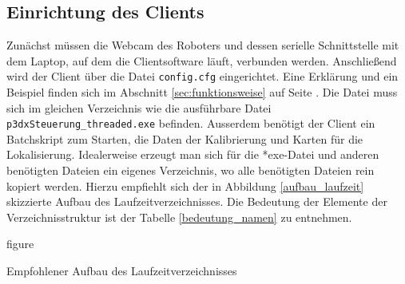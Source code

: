 
\subsection{Einrichtung des Clients}%
\label{sec:einrichtung-client}
Zunächst müssen die Webcam des Roboters und dessen serielle
Schnittstelle  mit dem Laptop, auf dem die Clientsoftware läuft,
verbunden  werden. Anschließend wird der Client über  die Datei \verb|config.cfg| eingerichtet. Eine
Erklärung und ein Beispiel finden sich im Abschnitt
\ref{sec:funktionsweise} auf Seite \pageref{aufbau_config}. Die Datei
muss sich im gleichen Verzeichnis wie die ausführbare Datei
\verb|p3dxSteuerung_threaded.exe| befinden. Ausserdem benötigt der
Client ein Batchskript zum Starten, die
Daten der Kalibrierung und Karten für die Lokalisierung. Idealerweise
erzeugt man sich für die *exe-Datei und anderen benötigten Dateien ein
eigenes Verzeichnis, wo alle benötigten Dateien rein kopiert werden.  Hierzu
empfiehlt sich der in Abbildung \ref{aufbau_laufzeit} skizzierte
Aufbau des Laufzeitverzeichnisses. Die Bedeutung der Elemente der
Verzeichnisstruktur ist der Tabelle
\ref{bedeutung_namen} zu entnehmen.
\begin{nofloat}{figure}%
\label{aufbau_laufzeit}
\centering
{}
\caption{Empfohlener Aufbau des Laufzeitverzeichnisses}  
\end{nofloat}
